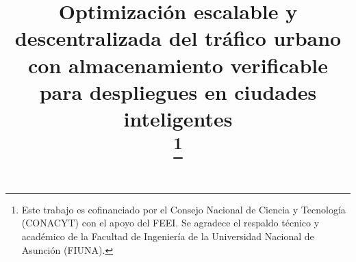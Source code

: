 \documentclass[conference]{IEEEtran}
\begin{document}
\title{Optimización escalable y descentralizada del tráfico urbano con almacenamiento verificable para despliegues en ciudades inteligentes \\
\thanks{Este trabajo es cofinanciado por el Consejo Nacional de Ciencia y Tecnología (CONACYT) con el apoyo del FEEI\@. Se agradece el respaldo técnico y académico de la Facultad de Ingeniería de la Universidad Nacional de Asunción (FIUNA)\@.}}

\author{
}

\maketitle

\begin{abstract}
\end{abstract}

\begin{IEEEkeywords}
\end{IEEEkeywords}
\end{document}

